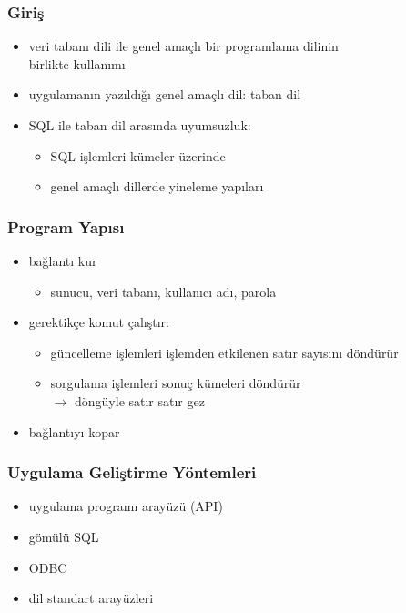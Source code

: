 \documentclass[dvipsnames]{beamer}
\theoremstyle{definition}
\theoremstyle{example}
\theoremstyle{plain}
\begin{document}
\begin{frame}
  \frametitle{Giriş}

  \begin{itemize}
    \item veri tabanı dili ile genel amaçlı bir programlama dilinin\\
      birlikte kullanımı
    \item uygulamanın yazıldığı genel amaçlı dil: \alert{taban dil}

    \pause
    \bigskip
    \item SQL ile taban dil arasında uyumsuzluk:
    \begin{itemize}
      \item SQL işlemleri kümeler üzerinde
      \item genel amaçlı dillerde yineleme yapıları
    \end{itemize}
  \end{itemize}
\end{frame}

\begin{frame}
  \frametitle{Program Yapısı}

  \begin{itemize}
    \item bağlantı kur
    \begin{itemize}
      \item sunucu, veri tabanı, kullanıcı adı, parola
    \end{itemize}

    \pause
    \medskip
    \item gerektikçe komut çalıştır:
    \begin{itemize}
      \item güncelleme işlemleri işlemden etkilenen satır sayısını döndürür
      \item sorgulama işlemleri sonuç kümeleri döndürür\\
        $\rightarrow$ döngüyle satır satır gez
    \end{itemize}

    \pause
    \medskip
    \item bağlantıyı kopar
  \end{itemize}
\end{frame}

\begin{frame}
  \frametitle{Uygulama Geliştirme Yöntemleri}

  \begin{itemize}
    \item uygulama programı arayüzü (API)
    \item gömülü SQL
    \item ODBC
    \item dil standart arayüzleri
  \end{itemize}
\end{frame}
\end{document}
